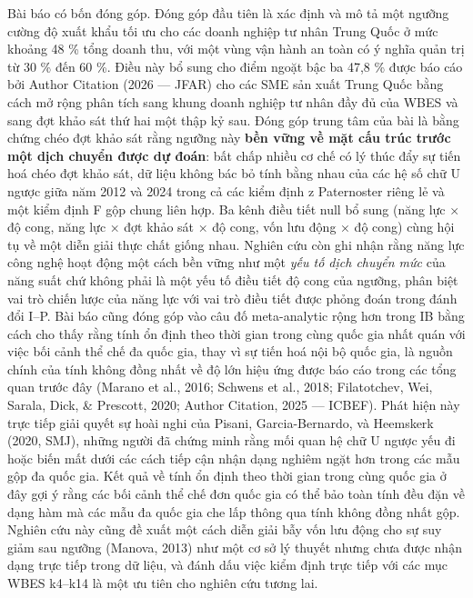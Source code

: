 \documentclass[12pt,a4paper]{article}
\begin{document}
Bài báo có bốn đóng góp. Đóng góp đầu tiên là xác định và mô tả một
ngưỡng cường độ xuất khẩu tối ưu cho các doanh nghiệp tư nhân Trung Quốc
ở mức khoảng 48 \% tổng doanh thu, với một vùng vận hành an toàn có ý
nghĩa quản trị từ 30 \% đến 60 \%. Điều này bổ sung cho điểm ngoặt bậc
ba 47,8 \% được báo cáo bởi Author Citation (2026 --- JFAR) cho các SME
sản xuất Trung Quốc bằng cách mở rộng phân tích sang khung doanh nghiệp
tư nhân đầy đủ của WBES và sang đợt khảo sát thứ hai một thập kỷ sau.
Đóng góp trung tâm của bài là bằng chứng chéo đợt khảo sát rằng ngưỡng
này \textbf{bền vững về mặt cấu trúc trước một dịch chuyển được dự
đoán}: bất chấp nhiều cơ chế có lý thúc đẩy sự tiến hoá chéo đợt khảo
sát, dữ liệu không bác bỏ tính bằng nhau của các hệ số chữ U ngược giữa
năm 2012 và 2024 trong cả các kiểm định z Paternoster riêng lẻ và một
kiểm định F gộp chung liên hợp. Ba kênh điều tiết null bổ sung (năng lực
× độ cong, năng lực × đợt khảo sát × độ cong, vốn lưu động × độ cong)
cùng hội tụ về một diễn giải thực chất giống nhau. Nghiên cứu còn ghi
nhận rằng năng lực công nghệ hoạt động một cách bền vững như một
\emph{yếu tố dịch chuyển mức} của năng suất chứ không phải là một yếu tố
điều tiết độ cong của ngưỡng, phân biệt vai trò chiến lược của năng lực
với vai trò điều tiết được phỏng đoán trong đánh đổi I--P. Bài báo cũng
đóng góp vào câu đố meta-analytic rộng hơn trong IB bằng cách cho thấy
rằng tính ổn định theo thời gian trong cùng quốc gia nhất quán với việc
bối cảnh thể chế đa quốc gia, thay vì sự tiến hoá nội bộ quốc gia, là
nguồn chính của tính không đồng nhất về độ lớn hiệu ứng được báo cáo
trong các tổng quan trước đây (Marano et al., 2016; Schwens et al.,
2018; Filatotchev, Wei, Sarala, Dick, \& Prescott, 2020; Author
Citation, 2025 --- ICBEF). Phát hiện này trực tiếp giải quyết sự hoài
nghi của Pisani, Garcia-Bernardo, và Heemskerk (2020, SMJ), những người
đã chứng minh rằng mối quan hệ chữ U ngược yếu đi hoặc biến mất dưới các
cách tiếp cận nhận dạng nghiêm ngặt hơn trong các mẫu gộp đa quốc gia.
Kết quả về tính ổn định theo thời gian trong cùng quốc gia ở đây gợi ý
rằng các bối cảnh thể chế đơn quốc gia có thể bảo toàn tính đều đặn về
dạng hàm mà các mẫu đa quốc gia che lấp thông qua tính không đồng nhất
gộp. Nghiên cứu này cũng đề xuất một cách diễn giải bẫy vốn lưu động cho
sự suy giảm sau ngưỡng (Manova, 2013) như một cơ sở lý thuyết nhưng chưa
được nhận dạng trực tiếp trong dữ liệu, và đánh dấu việc kiểm định trực
tiếp với các mục WBES k4--k14 là một ưu tiên cho nghiên cứu tương lai.
\end{document}
